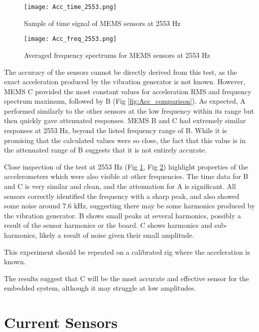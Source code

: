 \begin{figure}
    \centering
    \texttt{[image: Acc\_time\_2553.png]}
    \caption{Sample of time signal of MEMS sensors at 2553 Hz}
    \label{fig:Acc_time}
\end{figure}

\begin{figure}
    \centering
    \texttt{[image: Acc\_freq\_2553.png]}
    \caption{Averaged frequency spectrums for MEMS sensors at 2553 Hz}
    \label{fig:Acc_freq}
\end{figure}

The accuracy of the sensors cannot be directly derived from this test, as the exact acceleration produced by the vibration generator is not known.
However, MEMS C provided the most constant values for acceleration RMS and frequency spectrum maximum, followed by B (Fig \ref{fig:Acc_comparison}).
As expected, A performed similarly to the other sensors at the low frequency within its range but then quickly gave attenuated responses.
MEMS B and C had extremely similar responses at 2553 Hz, beyond the listed frequency range of B.
While it is promising that the calculated values were so close, the fact that this value is in the attenuated range of B suggests that it is not entirely accurate.
\par
Close inspection of the test at 2553 Hz (Fig \ref{fig:Acc_time}, Fig \ref{fig:Acc_freq}) highlight properties of the accelerometers which were also visible at other frequencies.
The time data for B and C is very similar and clean, and the attenuation for A is significant.
All sensors correctly identified the frequency with a sharp peak, and also showed some noise around 7.6 kHz, suggesting there may be some harmonics produced by the vibration generator.
B shows small peaks at several harmonics, possibly a result of the sensor harmonics or the board.
C shows harmonics and sub-harmonics, likely a result of noise given their small amplitude.
\par
This experiment should be repeated on a calibrated rig where the acceleration is known.
\par

The results suggest that C will be the most accurate and effective sensor for the embedded system, although it may struggle at low amplitudes.



\section{Current Sensors}


